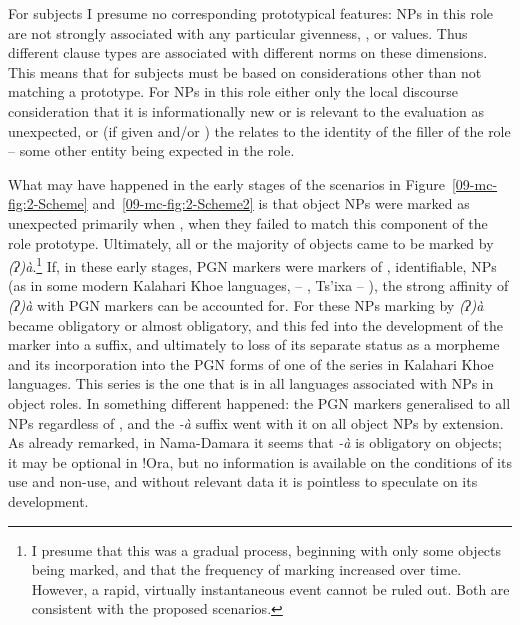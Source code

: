 \documentclass[output=paper]{LSP/langsci}
\begin{document}
For  subjects I presume no corresponding prototypical features: NPs in this role are not strongly associated with any particular givenness, , or  values. Thus different  clause types are associated with different norms on these dimensions. This means that for  subjects  must be based on considerations other than not matching a prototype. For NPs in this role either only the local discourse consideration that it is informationally new or  is relevant to the evaluation as unexpected, or (if given and/or ) the  relates to the identity of the filler of the role – some other entity being expected in the role.

What may have happened in the early stages of the scenarios in Figure~\ref{09-mc-fig:2-Scheme} and~\ref{09-mc-fig:2-Scheme2} is that object NPs were marked as unexpected primarily when , when they failed to match this component of the role prototype. Ultimately, all or the majority of  objects came to be marked by \textit{(ʔ)à}.\footnote{I presume that this was a gradual process, beginning with only some  objects being marked, and that the frequency of marking increased over time. However, a rapid, virtually instantaneous event cannot be ruled out. Both are consistent with the proposed scenarios.} If, in these early stages, PGN markers were markers of , \ie identifiable, NPs (as in some modern Kalahari Khoe languages, \eg {} – \citealt[43]{Kilian-Hatz2008Grammar}, Ts’ixa – \citealt[63, 74]{Fehn2014Grammar}), the strong affinity of \textit{(ʔ)à} with PGN markers can be accounted for. For these NPs marking by \textit{(ʔ)à} became obligatory or almost obligatory, and this fed into the development of the marker into a suffix, and ultimately to loss of its separate status as a morpheme and its incorporation into the PGN forms of one of the series in Kalahari Khoe languages. This series is the one that is in all languages associated with NPs in object roles. In  something different happened: the PGN markers generalised to all NPs regardless of , and the \textit{-à} suffix went with it on all object NPs by extension. As already remarked, in Nama-Damara it seems that \textit{-à} is obligatory on objects; it may be optional in !Ora, but no information is available on the conditions of its use and non-use, and without relevant data it is pointless to speculate on its development.
\end{document}

